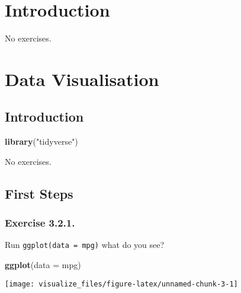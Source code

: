 \documentclass[]{book}
\newenvironment{Shaded}{\begin{snugshade}}{\end{snugshade}}
\newcommand{\DataTypeTok}[1]{\textcolor[rgb]{0.13,0.29,0.53}{#1}}
\newcommand{\KeywordTok}[1]{\textcolor[rgb]{0.13,0.29,0.53}{\textbf{#1}}}
\newcommand{\NormalTok}[1]{#1}
\newcommand{\StringTok}[1]{\textcolor[rgb]{0.31,0.60,0.02}{#1}}
\theoremstyle{plain}
\theoremstyle{remark}
\begin{document}
\hypertarget{explore-intro}{%
\chapter{Introduction}\label{explore-intro}}

No exercises.

\hypertarget{data-visualisation}{%
\chapter{Data Visualisation}\label{data-visualisation}}

\hypertarget{introduction-1}{%
\section{Introduction}\label{introduction-1}}

\begin{Shaded}
\begin{Highlighting}[]
\KeywordTok{library}\NormalTok{(}\StringTok{"tidyverse"}\NormalTok{)}
\end{Highlighting}
\end{Shaded}

No exercises.

\hypertarget{first-steps}{%
\section{First Steps}\label{first-steps}}

\hypertarget{exercise-3.2.1.}{%
\subsection*{\texorpdfstring{Exercise
{3.2.1}.}{Exercise 3.2.1.}}\label{exercise-3.2.1.}}

Run \texttt{ggplot(data\ =\ mpg)} what do you see?

\begin{Shaded}
\begin{Highlighting}[]
\KeywordTok{ggplot}\NormalTok{(}\DataTypeTok{data =}\NormalTok{ mpg)}
\end{Highlighting}
\end{Shaded}

\begin{center}\texttt{[image: visualize\_files/figure-latex/unnamed-chunk-3-1]} \end{center}
\end{document}
